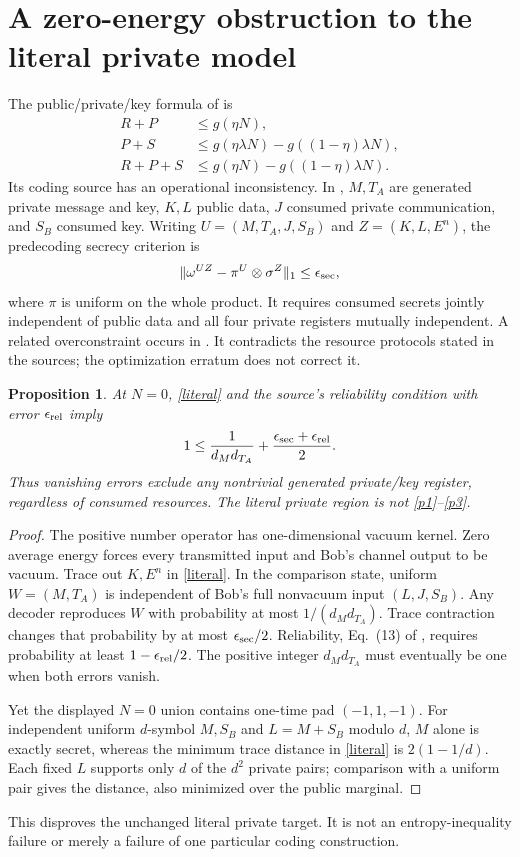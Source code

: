 \documentclass[11pt]{article}
\newtheorem{proposition}[theorem]{Proposition}
\begin{document}
\section{A zero-energy obstruction to the literal private model}
The public/private/key formula of \cite[Eq.\ (2)]{WHG} is
\begin{align}
 R+P&\le g(\eta N),\label{p1}\\
 P+S&\le g(\eta\lambda N)-g((1-\eta)\lambda N),\label{p2}\\
 R+P+S&\le g(\eta N)-g((1-\eta)\lambda N).\label{p3}
\end{align}
Its coding source has an operational inconsistency.
In \cite[Section 5, before Eq.\ (14)]{PDC}, $M,T_A$ are
generated private message and key, $K,L$ public data, $J$
consumed private communication, and $S_B$ consumed key.
Writing $U=(M,T_A,J,S_B)$ and $Z=(K,L,E^n)$, the predecoding secrecy criterion is
\begin{equation}\label{literal}
 \|\omega^{UZ}-\pi^U\otimes\sigma^Z\|_1
       \le\epsilon_{\rm sec},
\end{equation}
where $\pi$ is uniform on the whole product. It requires
consumed secrets jointly independent of public data and all
four private registers mutually independent.
A related overconstraint occurs in \cite[Eq.\ (4)]{PEPF}.
It contradicts the resource protocols stated in the sources;
the optimization erratum \cite{ERR} does not correct it.

\begin{proposition}\label{zero}
At $N=0$, \eqref{literal} and the source's reliability
condition with error $\epsilon_{\rm rel}$ imply
\[
 1\le\frac1{d_Md_{T_A}}+
            \frac{\epsilon_{\rm sec}+\epsilon_{\rm rel}}2.
\]
Thus vanishing errors exclude any nontrivial generated
private/key register, regardless of consumed resources.
The literal private region is not \eqref{p1}--\eqref{p3}.
\end{proposition}
\begin{proof}
The positive number operator has one-dimensional vacuum kernel.
Zero average energy forces every transmitted input and Bob's
channel output to be vacuum. Trace out $K,E^n$ in
\eqref{literal}. In the comparison state, uniform
$W=(M,T_A)$ is independent of Bob's full nonvacuum input
$(L,J,S_B)$. Any decoder reproduces $W$ with probability at
most $1/(d_Md_{T_A})$. Trace contraction changes that
probability by at most $\epsilon_{\rm sec}/2$.
Reliability, Eq.\ (13) of \cite{PDC}, requires probability
at least $1-\epsilon_{\rm rel}/2$.
The positive integer $d_Md_{T_A}$ must eventually be one
when both errors vanish.

Yet the displayed $N=0$ union contains one-time pad
$(-1,1,-1)$. For independent uniform $d$-symbol $M,S_B$ and
$L=M+S_B$ modulo $d$, $M$ alone is exactly secret, whereas
the minimum trace distance in \eqref{literal} is
$2(1-1/d)$. Each fixed $L$ supports only $d$ of the $d^2$
private pairs; comparison with a uniform pair gives the
distance, also minimized over the public marginal.
\end{proof}
This disproves the unchanged literal private target. It is
not an entropy-inequality failure or merely a failure of
one particular coding construction.
\end{document}
